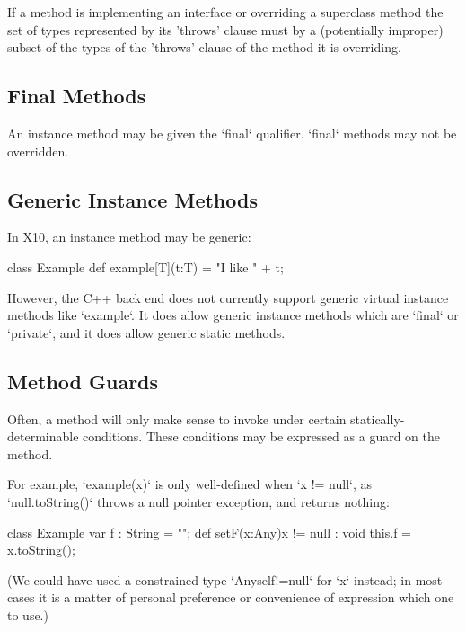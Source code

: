 If a method is implementing an interface or overriding a superclass
method the set of types represented by its \xcd'throws' clause must by
a (potentially improper) subset of the types of the \xcd'throws'
clause of the method it is overriding. 

\subsection{Final Methods}
An instance method may be given the \xcd`final` qualifier.  \xcd`final`
methods may not be overridden.

\subsection{Generic Instance Methods}

\limitationx{}
In X10, an instance method may be generic: 
\begin{xten}
class Example {
  def example[T](t:T) = "I like " + t;
}
\end{xten}
%

However, the C++ back end does not currently support generic virtual instance
methods like \xcd`example`.  It does allow generic instance methods which are
\xcd`final` or \xcd`private`, and it does allow generic static methods.  


\subsection{Method Guards}
\label{MethodGuard}

Often, a method will only make sense to invoke under certain
statically-determinable conditions.  These conditions may be expressed as a
guard on the method.

\begin{ex}
For example, \xcd`example(x)` is only
well-defined when \xcd`x != null`, as \xcd`null.toString()` throws a null
pointer exception, and returns nothing: 
% 
\begin{xten}
class Example {
   var f : String = "";
   def setF(x:Any){x != null} : void {
      this.f = x.toString();
   }
}
\end{xten}
%
\noindent
(We could have used a constrained type \xcd`Any{self!=null}` for \xcd`x`
instead; in
most cases it is a matter of personal preference or convenience of expression
which one to use.) 
\end{ex}


